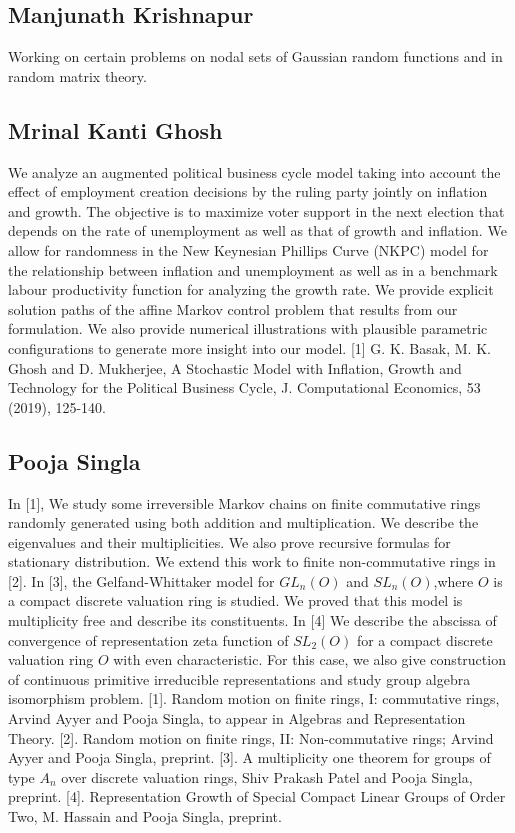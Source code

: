 \subsection{Manjunath Krishnapur}

Working on certain problems on nodal sets of Gaussian random functions and in random matrix theory.


\subsection{Mrinal Kanti Ghosh}

We analyze an augmented political business cycle model taking into account the effect of employment creation decisions by the ruling party jointly on inflation and growth. The objective is to maximize voter support in the next election that depends on the rate of unemployment as well as that of growth and inflation. We allow for randomness in the New Keynesian Phillips Curve (NKPC) model for the relationship between  inflation and unemployment as well as in a benchmark labour productivity function for   analyzing the growth rate. We provide explicit solution paths of the affine Markov   control problem that results from our formulation. We also provide numerical illustrations with plausible parametric configurations to generate more insight into our model. [1] G. K. Basak, M. K. Ghosh and D. Mukherjee, A Stochastic Model with Inflation, Growth and Technology  for the Political Business Cycle, J. Computational Economics, 53 (2019), 125-140.


\subsection{Pooja Singla}

In [1], We study some irreversible Markov chains on finite commutative rings randomly generated using both addition and multiplication. We describe the eigenvalues and their multiplicities. We also prove recursive formulas for stationary distribution. We extend this work to finite non-commutative rings in [2].   In [3], the Gelfand-Whittaker model for $GL_n(O)$ and $SL_n(O)$,where $O$ is a  compact discrete valuation ring is studied. We proved that this model is multiplicity free and describe its constituents.   In [4] We describe the abscissa of convergence of representation zeta function of $SL_2(O)$ for a compact discrete valuation ring $O$ with even characteristic. For this case, we also give construction of continuous primitive irreducible representations and study group algebra isomorphism problem.   [1]. Random motion on finite rings, I: commutative rings, Arvind Ayyer and Pooja Singla, to appear in Algebras and Representation Theory.  [2]. Random motion on finite rings, II: Non-commutative rings; Arvind Ayyer and Pooja Singla, preprint.   [3]. A multiplicity one theorem for groups of type $A_n$ over discrete valuation rings, Shiv Prakash Patel and Pooja Singla, preprint.  [4]. Representation Growth of Special Compact Linear Groups of Order Two,  M. Hassain and Pooja Singla, preprint. 


